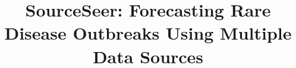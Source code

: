 \documentclass[twoside,leqno,twocolumn]{article}
\newcommand{\fullmodel}{{{\sf SourceSeer}}\xspace}
\begin{document}

\title{\fullmodel: Forecasting Rare Disease Outbreaks Using Multiple Data Sources}
\date{}

\end{document}
